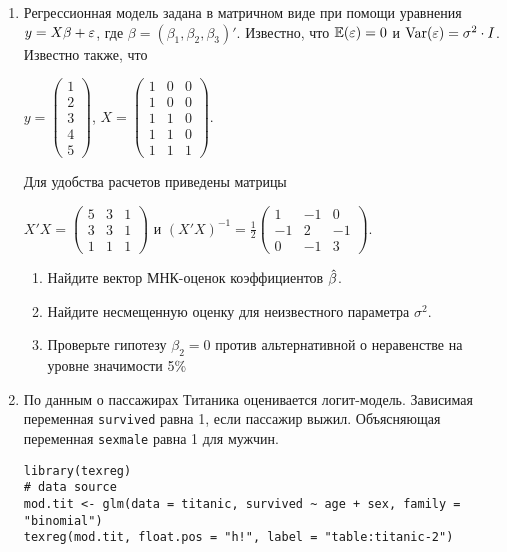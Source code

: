 \documentclass[12pt, a4paper]{article}
\theoremstyle{definition}
\begin{document}
\begin{enumerate}
\item Регрессионная модель  задана в матричном виде при помощи уравнения $y=X\beta+\varepsilon$, где $\beta=(\beta_1,\beta_2,\beta_3)'$.
Известно, что $\operatorname{\mathbb{E}}(\varepsilon)=0$  и  $\operatorname{Var}(\varepsilon)=\sigma^2\cdot I$.
Известно также, что

$y=\left(
\begin{array}{c}
1\\
2\\
3\\
4\\
5
\end{array}\right)$,
$X=\left(\begin{array}{ccc}
1 & 0 & 0 \\
1 & 0 & 0 \\
1 & 1 & 0 \\
1 & 1 & 0 \\
1 & 1 & 1
\end{array}\right)$.


Для удобства расчетов приведены матрицы


$X'X=\left(
\begin{array}{ccc}
5 & 3 & 1\\
3 & 3 & 1\\
1 & 1 & 1
\end{array}\right)$ и $(X'X)^{-1}=\frac{1}{2}\left(
\begin{array}{ccc}
1 & -1 & 0 \\
-1 & 2 & -1 \\
0 & -1 & 3
\end{array}\right)$.

\begin{enumerate}
\item Найдите вектор МНК-оценок коэффициентов $\hat{\beta}$.
\item Найдите несмещенную оценку для неизвестного параметра $\sigma^2$.
\item Проверьте гипотезу $\beta_2=0$ против альтернативной о неравенстве на уровне значимости 5\%

\end{enumerate}




\item По данным о пассажирах Титаника оценивается логит-модель. Зависимая переменная \verb|survived| равна 1, если пассажир выжил. Объясняющая переменная \verb|sexmale| равна 1 для  мужчин.

\begin{verbatim}
library(texreg)
# data source
mod.tit <- glm(data = titanic, survived ~ age + sex, family = "binomial")
texreg(mod.tit, float.pos = "h!", label = "table:titanic-2")
\end{verbatim}


\end{enumerate}
\end{document}
